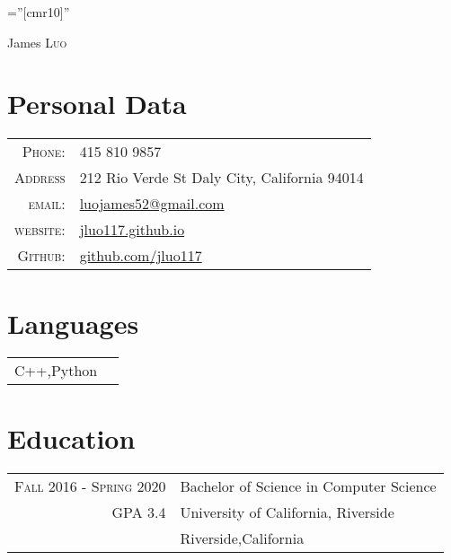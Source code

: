 \documentclass[a4paper,12pt]{article}
\begin{document}

\pagestyle{empty} %

\font\fb=''[cmr10]'' %

\par{\centering
    {\Huge James \textsc{Luo}
  }\bigskip\par}

\section{Personal Data}

\begin{tabular}{rl}
        \textsc{Phone:}     & 415 810 9857\\
        \textsc{Address} & 212 Rio Verde St Daly City, California 94014\\
    \textsc{email:}     & \href{mailto:luojames52@gmail.com}{luojames52@gmail.com}\\
    \textsc{website:} &
    \href{https://jluo117.github.io}{jluo117.github.io}\\
    \textsc{Github:} &
    \href{https://github.com/jluo117}{github.com/jluo117}
\end{tabular}

\section{Languages}
\begin{tabular}{rl}
 
\textsc{C++},{Python} \\
\end{tabular}

\section{Education}
\begin{tabular}{rl} 
\textsc{Fall 2016 - Spring 2020} & Bachelor of Science in Computer Science\\
\textsc{GPA 3.4}
& University of California, Riverside \\
& Riverside,California\\
\end{tabular}
\end{document}
